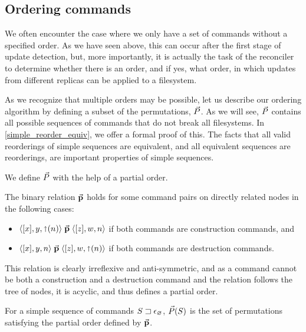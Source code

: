 
\subsection{Ordering commands}

We often encounter the case where we only have a set of commands without a specified order.
As we have seen above, this can occur after the first stage of update detection,
but, more importantly,
it is actually the task of the reconciler to determine whether there is an order,
and if yes, what order,
in which updates from different replicas can be applied to a filesystem.

As we recognize that multiple orders may be possible,
let us describe our ordering algorithm by
defining a subset of the permutations, $\ordersetsign$.
As we will see, $\ordersetsign$ contains all possible
sequences of commands that do not break all filesystems.
In \cref{simple_reorder_equiv}, we offer a formal proof of this.
The facts that all valid reorderings of simple sequences are equivalent,
and all equivalent sequences are reorderings, are important 
properties of simple sequences.

We define $\ordersetsign$ with the help of a partial order.
\begin{mydef}[$\orderrel$]
The binary relation $\orderrel$ holds for some command pairs
on directly related nodes in the following cases:
\begin{itemize}
\item $\langle{[x],y,\mathord{\shortuparrow}({n})}\rangle \mathrel{\vec{\mathbf{p}}} \langle{[z],w,n}\rangle$ if both commands are construction commands, and
\item $\langle{[x],y,n}\rangle \mathrel{\vec{\mathbf{p}}} \langle{[z],w,\mathord{\shortuparrow}({n})}\rangle$ if both commands are destruction commands. \qedhere
\end{itemize}
\end{mydef}
This relation is clearly irreflexive and anti-symmetric,
and as a command cannot be both a construction and a destruction command and
the relation follows the tree of nodes, it is acyclic,
and thus defines a partial order.

\begin{mydef}[$\ordersetsign$]
For a simple sequence of commands ${S}\sqsupset\epsilon_\varnothing$,
$\vec{P}({S})$ is the set of permutations satisfying the partial order defined by $\orderrel$.
\end{mydef}

